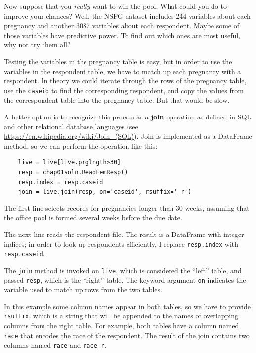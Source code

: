 \documentclass[12pt]{book}
\begin{document}
Now suppose that you {\em really\/} want to win the pool.  What could
you do to improve your chances?  Well, 
the NSFG dataset includes 244 variables about each pregnancy and another
3087 variables about each respondent.  Maybe some of those variables
have predictive power.  To find out which ones are most useful,
why not try them all?

Testing the variables in the pregnancy table is easy, but in order to
use the variables in the respondent table, we have to match up each
pregnancy with a respondent.  In theory we could iterate through the
rows of the pregnancy table, use the \verb"caseid" to find the
corresponding respondent, and copy the values from the
correspondent table into the pregnancy table.  But that would be slow.

A better option is to recognize this process as a {\bf join} operation
as defined in SQL and other relational database languages (see
\url{https://en.wikipedia.org/wiki/Join_(SQL)}).  Join is implemented
as a DataFrame method, so we can perform the operation like this:

\begin{verbatim}
    live = live[live.prglngth>30]
    resp = chap01soln.ReadFemResp()
    resp.index = resp.caseid
    join = live.join(resp, on='caseid', rsuffix='_r')
\end{verbatim}

The first line selects records for pregnancies longer than 30 weeks,
assuming that the office pool is formed several weeks before the
due date.

The next line reads the respondent file.  The result is a DataFrame
with integer indices; in order to look up respondents efficiently,
I replace \verb"resp.index" with \verb"resp.caseid". 

The \verb"join" method is invoked on \verb"live", which is considered
the ``left'' table, and passed \verb"resp", which is the ``right'' table.
The keyword argument \verb"on" indicates the variable used to match up
rows from the two tables.

In this example some column names appear in both tables,
so we have to provide \verb"rsuffix", which is a string that will be
appended to the names of overlapping columns from the right table.
For example, both tables have a column named \verb"race" that encodes
the race of the respondent.  The result of the join contains two
columns named \verb"race" and \verb"race_r".
\end{document}
